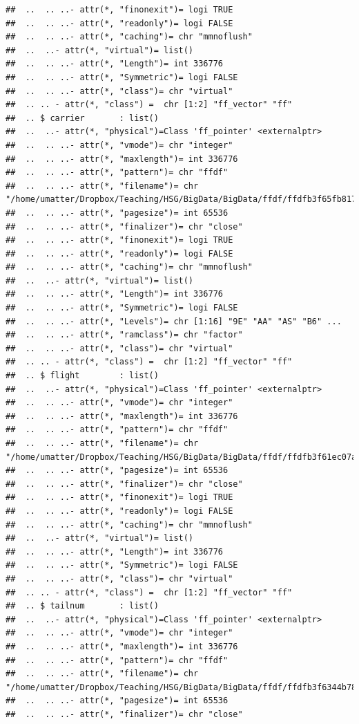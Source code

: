 \documentclass[
  12pt,
]{style/krantz}
\begin{document}
\begin{verbatim}
##  ..  .. ..- attr(*, "finonexit")= logi TRUE
##  ..  .. ..- attr(*, "readonly")= logi FALSE
##  ..  .. ..- attr(*, "caching")= chr "mmnoflush"
##  ..  ..- attr(*, "virtual")= list()
##  ..  .. ..- attr(*, "Length")= int 336776
##  ..  .. ..- attr(*, "Symmetric")= logi FALSE
##  ..  .. ..- attr(*, "class")= chr "virtual"
##  .. .. - attr(*, "class") =  chr [1:2] "ff_vector" "ff"
##  .. $ carrier       : list()
##  ..  ..- attr(*, "physical")=Class 'ff_pointer' <externalptr> 
##  ..  .. ..- attr(*, "vmode")= chr "integer"
##  ..  .. ..- attr(*, "maxlength")= int 336776
##  ..  .. ..- attr(*, "pattern")= chr "ffdf"
##  ..  .. ..- attr(*, "filename")= chr "/home/umatter/Dropbox/Teaching/HSG/BigData/BigData/ffdf/ffdfb3f65fb8171c.ff"
##  ..  .. ..- attr(*, "pagesize")= int 65536
##  ..  .. ..- attr(*, "finalizer")= chr "close"
##  ..  .. ..- attr(*, "finonexit")= logi TRUE
##  ..  .. ..- attr(*, "readonly")= logi FALSE
##  ..  .. ..- attr(*, "caching")= chr "mmnoflush"
##  ..  ..- attr(*, "virtual")= list()
##  ..  .. ..- attr(*, "Length")= int 336776
##  ..  .. ..- attr(*, "Symmetric")= logi FALSE
##  ..  .. ..- attr(*, "Levels")= chr [1:16] "9E" "AA" "AS" "B6" ...
##  ..  .. ..- attr(*, "ramclass")= chr "factor"
##  ..  .. ..- attr(*, "class")= chr "virtual"
##  .. .. - attr(*, "class") =  chr [1:2] "ff_vector" "ff"
##  .. $ flight        : list()
##  ..  ..- attr(*, "physical")=Class 'ff_pointer' <externalptr> 
##  ..  .. ..- attr(*, "vmode")= chr "integer"
##  ..  .. ..- attr(*, "maxlength")= int 336776
##  ..  .. ..- attr(*, "pattern")= chr "ffdf"
##  ..  .. ..- attr(*, "filename")= chr "/home/umatter/Dropbox/Teaching/HSG/BigData/BigData/ffdf/ffdfb3f61ec07a7d.ff"
##  ..  .. ..- attr(*, "pagesize")= int 65536
##  ..  .. ..- attr(*, "finalizer")= chr "close"
##  ..  .. ..- attr(*, "finonexit")= logi TRUE
##  ..  .. ..- attr(*, "readonly")= logi FALSE
##  ..  .. ..- attr(*, "caching")= chr "mmnoflush"
##  ..  ..- attr(*, "virtual")= list()
##  ..  .. ..- attr(*, "Length")= int 336776
##  ..  .. ..- attr(*, "Symmetric")= logi FALSE
##  ..  .. ..- attr(*, "class")= chr "virtual"
##  .. .. - attr(*, "class") =  chr [1:2] "ff_vector" "ff"
##  .. $ tailnum       : list()
##  ..  ..- attr(*, "physical")=Class 'ff_pointer' <externalptr> 
##  ..  .. ..- attr(*, "vmode")= chr "integer"
##  ..  .. ..- attr(*, "maxlength")= int 336776
##  ..  .. ..- attr(*, "pattern")= chr "ffdf"
##  ..  .. ..- attr(*, "filename")= chr "/home/umatter/Dropbox/Teaching/HSG/BigData/BigData/ffdf/ffdfb3f6344b78fe.ff"
##  ..  .. ..- attr(*, "pagesize")= int 65536
##  ..  .. ..- attr(*, "finalizer")= chr "close"

\end{verbatim}
\end{document}
